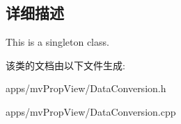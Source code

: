 \subsection{详细描述}
This is a singleton class. 

该类的文档由以下文件生成\+:\begin{DoxyCompactItemize}
\item 
apps/mv\+Prop\+View/Data\+Conversion.\+h\item 
apps/mv\+Prop\+View/Data\+Conversion.\+cpp\end{DoxyCompactItemize}
